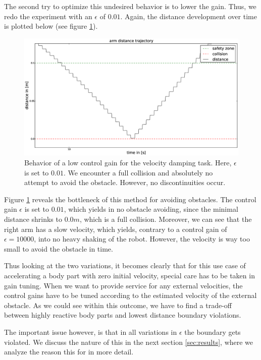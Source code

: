 The second try to optimize this undesired behavior is to lower the gain. Thus, we redo the experiment with an $\epsilon$ of $0.01$. Again, the distance development over time is plotted below (see figure \ref{fig:objmovesdistancek1}).
\begin{figure}[h!]
  \centering
    \includegraphics[width=\textwidth]{../figures/object_moves/distancek001.eps}
    \caption{Behavior of a low control gain for the velocity damping task. Here, $\epsilon$ is set to $0.01$. We encounter a full collision and absolutely no attempt to avoid the obstacle. However, no discontinuities occur.}
    \label{fig:objmovesdistancek1}
\end{figure}

Figure \ref{fig:objmovesdistancek1} reveals the bottleneck of this method for avoiding obstacles. The control gain $\epsilon$ is set to $0.01$, which yields in no obstacle avoiding, since the minimal distance shrinks to $0.0m$, which is a full collision. Moreover, we can see that the right arm has a slow velocity, which yields, contrary to a control gain of $\epsilon=10000$,  into no heavy shaking of the robot. However, the velocity is way too small to avoid the obstacle in time.

Thus looking at the two variations, it becomes clearly that for this use case of accelerating a body part with zero initial velocity, special care has to be taken in gain tuning. When we want to provide service for any external velocities, the control gains have to be tuned according to the estimated velocity of the external obstacle. As we could see within this outcome, we have to find a trade-off between highly reactive body parts and lowest distance boundary violations. 

The important issue however, is that in all variations in $\epsilon$ the boundary gets violated. We discuss the nature of this in the next section \ref{sec:results}, where we analyze the reason this for in more detail.

